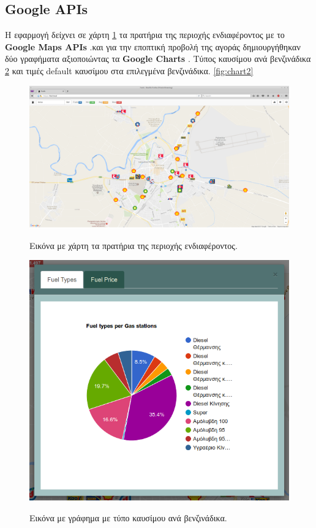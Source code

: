 \subsection{Google APIs}
Η εφαρμογή δείχνει σε χάρτη \ref{fig:map} τα πρατήρια της περιοχής ενδιαφέροντος με το \textbf{Google Maps APIs} \cite{google-map}.και για την εποπτική προβολή της αγοράς δημιουργήθηκαν δύο γραφήματα αξιοποιώντας τα \textbf{Google Charts} \cite{google-chart}. Τύπος καυσίμου ανά βενζινάδικα \ref{fig:chart1} και τιμές default καυσίμου στα επιλεγμένα βενζινάδικα. \ref{fig:chart2}

\begin{figure}[H]
  \caption{Εικόνα με χάρτη τα πρατήρια της περιοχής ενδιαφέροντος.}
  \centering
    \includegraphics[width=1\textwidth]{img/map.png}
    \label{fig:map}
\end{figure}

\begin{figure}[H]
  \caption{Εικόνα με γράφημα με τύπο καυσίμου ανά βενζινάδικα.}
  \centering
    \includegraphics[width=1\textwidth]{img/chart1.png}
    \label{fig:chart1}
\end{figure}

